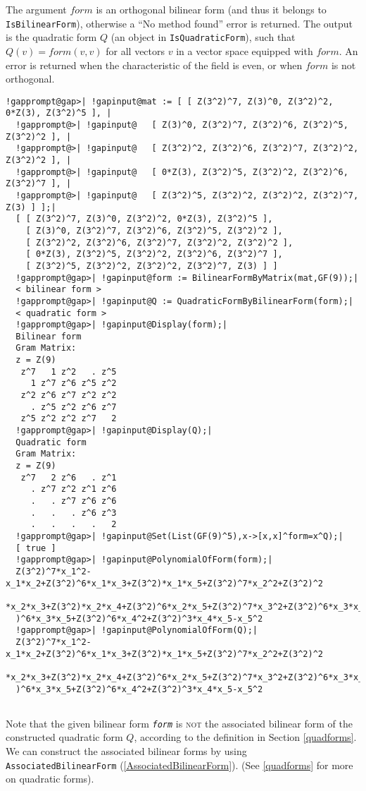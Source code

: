 \documentclass[a4paper,11pt]{report}
\begin{document}
{{{The argument $form$ is an orthogonal bilinear form (and thus it belongs to \texttt{IsBilinearForm}), otherwise a ``No method found'' error is returned. The output is the
quadratic form $Q$ (an object in \texttt{IsQuadraticForm}), such that $Q(v) = form(v,v)$ for all vectors $v$ in a vector space equipped with $form$. An error is returned when the characteristic of the field is even, or when $form$ is not orthogonal. 
\begin{Verbatim}[commandchars=!@|,fontsize=\small,frame=single,label=Example]
  !gapprompt@gap>| !gapinput@mat := [ [ Z(3^2)^7, Z(3)^0, Z(3^2)^2, 0*Z(3), Z(3^2)^5 ], |
  !gapprompt@>| !gapinput@   [ Z(3)^0, Z(3^2)^7, Z(3^2)^6, Z(3^2)^5, Z(3^2)^2 ], |
  !gapprompt@>| !gapinput@   [ Z(3^2)^2, Z(3^2)^6, Z(3^2)^7, Z(3^2)^2, Z(3^2)^2 ], |
  !gapprompt@>| !gapinput@   [ 0*Z(3), Z(3^2)^5, Z(3^2)^2, Z(3^2)^6, Z(3^2)^7 ], |
  !gapprompt@>| !gapinput@   [ Z(3^2)^5, Z(3^2)^2, Z(3^2)^2, Z(3^2)^7, Z(3) ] ];|
  [ [ Z(3^2)^7, Z(3)^0, Z(3^2)^2, 0*Z(3), Z(3^2)^5 ], 
    [ Z(3)^0, Z(3^2)^7, Z(3^2)^6, Z(3^2)^5, Z(3^2)^2 ], 
    [ Z(3^2)^2, Z(3^2)^6, Z(3^2)^7, Z(3^2)^2, Z(3^2)^2 ], 
    [ 0*Z(3), Z(3^2)^5, Z(3^2)^2, Z(3^2)^6, Z(3^2)^7 ], 
    [ Z(3^2)^5, Z(3^2)^2, Z(3^2)^2, Z(3^2)^7, Z(3) ] ]
  !gapprompt@gap>| !gapinput@form := BilinearFormByMatrix(mat,GF(9));|
  < bilinear form >
  !gapprompt@gap>| !gapinput@Q := QuadraticFormByBilinearForm(form);|
  < quadratic form >
  !gapprompt@gap>| !gapinput@Display(form);|
  Bilinear form
  Gram Matrix:
  z = Z(9)
   z^7   1 z^2   . z^5
     1 z^7 z^6 z^5 z^2
   z^2 z^6 z^7 z^2 z^2
     . z^5 z^2 z^6 z^7
   z^5 z^2 z^2 z^7   2
  !gapprompt@gap>| !gapinput@Display(Q);|
  Quadratic form
  Gram Matrix:
  z = Z(9)
   z^7   2 z^6   . z^1
     . z^7 z^2 z^1 z^6
     .   . z^7 z^6 z^6
     .   .   . z^6 z^3
     .   .   .   .   2
  !gapprompt@gap>| !gapinput@Set(List(GF(9)^5),x->[x,x]^form=x^Q);|
  [ true ]
  !gapprompt@gap>| !gapinput@PolynomialOfForm(form);|
  Z(3^2)^7*x_1^2-x_1*x_2+Z(3^2)^6*x_1*x_3+Z(3^2)*x_1*x_5+Z(3^2)^7*x_2^2+Z(3^2)^2
  *x_2*x_3+Z(3^2)*x_2*x_4+Z(3^2)^6*x_2*x_5+Z(3^2)^7*x_3^2+Z(3^2)^6*x_3*x_4+Z(3^2
  )^6*x_3*x_5+Z(3^2)^6*x_4^2+Z(3^2)^3*x_4*x_5-x_5^2
  !gapprompt@gap>| !gapinput@PolynomialOfForm(Q);|
  Z(3^2)^7*x_1^2-x_1*x_2+Z(3^2)^6*x_1*x_3+Z(3^2)*x_1*x_5+Z(3^2)^7*x_2^2+Z(3^2)^2
  *x_2*x_3+Z(3^2)*x_2*x_4+Z(3^2)^6*x_2*x_5+Z(3^2)^7*x_3^2+Z(3^2)^6*x_3*x_4+Z(3^2
  )^6*x_3*x_5+Z(3^2)^6*x_4^2+Z(3^2)^3*x_4*x_5-x_5^2
   
\end{Verbatim}
 Note that the given bilinear form \mbox{\texttt{\mdseries\slshape form}} is \textsc{not} the associated bilinear form of the constructed quadratic form $Q$, according to the definition in Section \ref{quadforms}. We can construct the associated bilinear forms by using \texttt{AssociatedBilinearForm} (\ref{AssociatedBilinearForm}). (See \ref{quadforms} for more on quadratic forms). }

}}
\end{document}
